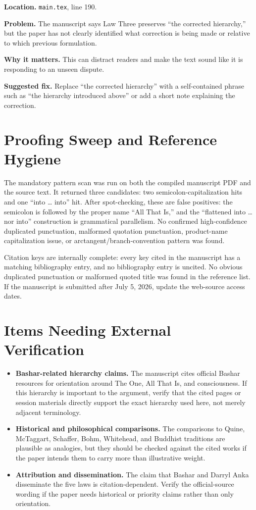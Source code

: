 \documentclass[11pt]{article}
\begin{document}
\textbf{Location.} \texttt{main.tex}, line 190.

\textbf{Problem.} The manuscript says Law Three preserves ``the corrected hierarchy,'' but the paper has not clearly identified what correction is being made or relative to which previous formulation.

\textbf{Why it matters.} This can distract readers and make the text sound like it is responding to an unseen dispute.

\textbf{Suggested fix.} Replace ``the corrected hierarchy'' with a self-contained phrase such as ``the hierarchy introduced above'' or add a short note explaining the correction.

\section*{Proofing Sweep and Reference Hygiene}

The mandatory pattern scan was run on both the compiled manuscript PDF and the source text. It returned three candidates: two semicolon-capitalization hits and one ``into \ldots{} into'' hit. After spot-checking, these are false positives: the semicolon is followed by the proper name ``All That Is,'' and the ``flattened into \ldots{} nor into'' construction is grammatical parallelism. No confirmed high-confidence duplicated punctuation, malformed quotation punctuation, product-name capitalization issue, or arctangent/branch-convention pattern was found.

Citation keys are internally complete: every key cited in the manuscript has a matching bibliography entry, and no bibliography entry is uncited. No obvious duplicated punctuation or malformed quoted title was found in the reference list. If the manuscript is submitted after July 5, 2026, update the web-source access dates.

\section*{Items Needing External Verification}

\begin{itemize}
    \item \textbf{Bashar-related hierarchy claims.} The manuscript cites official Bashar resources for orientation around The One, All That Is, and consciousness. If this hierarchy is important to the argument, verify that the cited pages or session materials directly support the exact hierarchy used here, not merely adjacent terminology.
    \item \textbf{Historical and philosophical comparisons.} The comparisons to Quine, McTaggart, Schaffer, Bohm, Whitehead, and Buddhist traditions are plausible as analogies, but they should be checked against the cited works if the paper intends them to carry more than illustrative weight.
    \item \textbf{Attribution and dissemination.} The claim that Bashar and Darryl Anka disseminate the five laws is citation-dependent. Verify the official-source wording if the paper needs historical or priority claims rather than only orientation.
\end{itemize}
\end{document}
